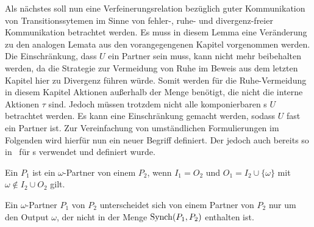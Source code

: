 Als nächstes soll nun eine Verfeinerungsrelation bezüglich guter Kommunikation
von Transitionssytemen im Sinne von fehler-, ruhe- und divergenz-freier
Kommunikation betrachtet werden. Es muss in diesem Lemma eine Veränderung zu
den analogen Lemata aus den vorangegengenen Kapitel vorgenommen werden. Die
Einschränkung, dass $U$ ein Partner sein muss, kann nicht mehr beibehalten
werden, da die Strategie zur Vermeidung von Ruhe im Beweis aus dem letzten
Kapitel hier zu Divergenz führen würde. Somit werden für die Ruhe-Vermeidung in
diesem Kapitel Aktionen außerhalb der Menge \Synch{} benötigt, die nicht die
interne Aktionen $\tau$ sind. Jedoch müssen trotzdem nicht alle komponierbaren
\MEIO{}s $U$ betrachtet werden. Es kann eine Einschränkung gemacht werden,
sodass $U$ fast ein Partner ist. Zur Vereinfachung von umständlichen
Formulierungen im Folgenden wird hierfür nun ein neuer Begriff definiert. Der
jedoch auch bereits so in~\cite{Schinko2016BA} für \EIO{}s verwendet und
definiert wurde.

\begin{Def}
  Ein \MEIO{} $P_1$ ist ein $\omega$-Partner von einem \MEIO{} $P_2$, wenn
  $I_1=O_2$ und $O_1=I_2\cup\{\omega\}$ mit $\omega\notin I_2\cup O_2$ gilt.
\end{Def}

Ein $\omega$-Partner $P_1$ von $P_2$ unterscheidet sich von einem Partner von
$P_2$ nur um den Output $\omega$, der nicht in der Menge $\mathrm{Synch} (P_1,P_2)$
enthalten ist.

